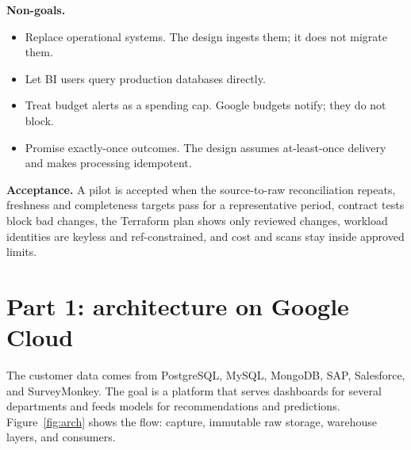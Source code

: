 \documentclass[10pt,a4paper]{article}
\begin{document}
\textbf{Non-goals.}
\begin{itemize}
  \item Replace operational systems. The design ingests them; it does not migrate them.
  \item Let BI users query production databases directly.
  \item Treat budget alerts as a spending cap. Google budgets notify; they do not block.\cite{gcBudget}
  \item Promise exactly-once outcomes. The design assumes at-least-once delivery and makes processing idempotent.\cite{gcPubSubExactly}
\end{itemize}

\textbf{Acceptance.} A pilot is accepted when the source-to-raw
reconciliation repeats, freshness and completeness targets pass for a
representative period, contract tests block bad changes, the Terraform
plan shows only reviewed changes, workload identities are keyless and
ref-constrained, and cost and scans stay inside approved limits.

\section{Part 1: architecture on Google Cloud}

The customer data comes from PostgreSQL, MySQL, MongoDB, SAP, Salesforce,
and SurveyMonkey. The goal is a platform that serves dashboards for
several departments and feeds models for recommendations and
predictions. Figure~\ref{fig:arch} shows the flow: capture, immutable
raw storage, warehouse layers, and consumers.
\end{document}
